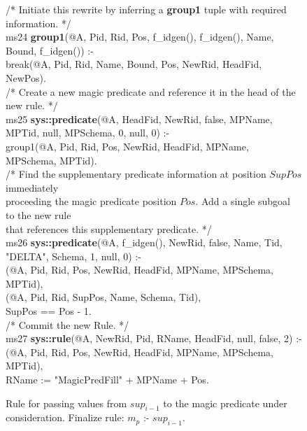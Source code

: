 \begin{appendix}
\begin{figure}[!t]
\ssp
\centering
\begin{boxedminipage}{\linewidth}
/* Initiate this rewrite by inferring a {\bf group1} tuple with required information. */ \\
ms24 {\bf group1}(@A, Pid, Rid, Pos, f\_idgen(), f\_idgen(), Name, Bound, f\_idgen()) :- \\
\datalogspace break(@A, Pid, Rid, Name, Bound, Pos, NewRid, HeadFid, NewPos). \\
	
/* Create a new magic predicate and reference it in the head of the new rule. */ \\
ms25 {\bf sys::predicate}(@A, HeadFid, NewRid, false, MPName, MPTid, null, MPSchema, 0, null, 0) :- \\
\datalogspace group1(@A, Pid, Rid, Pos, NewRid, HeadFid, MPName, MPSchema, MPTid). \\
	
/* Find the supplementary predicate information at position $SupPos$ immediately \\
proceeding the magic predicate position $Pos$. Add a single subgoal to the new rule \\
that references this supplementary predicate. */ \\
ms26 {\bf sys::predicate}(@A, f\_idgen(), NewRid, false, Name, Tid, "DELTA", Schema, 1, null, 0) :- \\
(@A, Pid, Rid, Pos, NewRid, HeadFid, MPName, MPSchema, MPTid), \\
(@A, Pid, Rid, SupPos, Name, Schema, Tid), \\
\datalogspace SupPos == Pos - 1. \\
	
/* Commit the new Rule. */ \\
ms27 {\bf sys::rule}(@A, NewRid, Pid, RName, HeadFid, null, false, 2) :- \\
(@A, Pid, Rid, Pos, NewRid, HeadFid, MPName, MPSchema, MPTid), \\
\datalogspace RName := "MagicPredFill" + MPName + Pos. \\

\end{boxedminipage}
\caption{\label{ch:evita:fig:mpgoal} Rule for passing values from $sup_{i-1}$ to the 
magic predicate under consideration. Finalize rule: $m_p$ :- $sup_{i-1}$.}
\end{figure}


\end{appendix}

